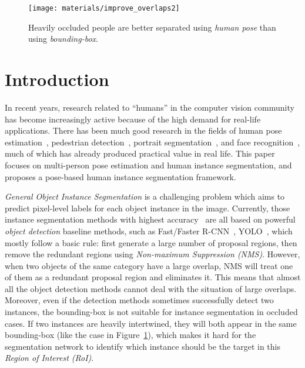 \documentclass[10pt,twocolumn,letterpaper]{article}
\begin{document}
\begin{figure}[t]
\centering
\texttt{[image: materials/improve\_overlaps2]}
\setlength{\abovecaptionskip}{-0.4cm}
\setlength{\belowcaptionskip}{-0.6cm}
\caption{Heavily occluded people are 
better separated using \emph{human pose} than using \emph{bounding-box}.}
\label{fig:improve_overlaps}
\end{figure}

\section{Introduction}
\label{intro}

In recent years, research related to ``humans'' in the computer vision community has become increasingly active because of the high demand for real-life applications. There has been much good research in the fields of human pose estimation~\cite{cao2017realtime,chen2017cascaded,fang2017rmpe,He2017Mask,lifkooee2019real,Newell2016Associative, xia2017survey}, pedestrian detection~\cite{mao2017can,zhang2016faster,zhang2018occluded}, portrait segmentation~\cite{shen2017high,shen2016automatic,Shen2016Deep}, and face recognition~\cite{ koestinger2011annotated, liu2017robust, ma2018robust, ouyang2016fast, wang2017joint, zhang2014facial, zhou2013extensive}, much of which has already produced practical value in real life.  This paper focuses on multi-person pose estimation and human instance segmentation, and proposes a pose-based human instance segmentation framework.

\emph{General Object Instance Segmentation} is a challenging problem which aims to predict pixel-level labels for each object instance in the image. Currently, those instance segmentation methods with highest accuracy~\cite{dai2016instance, He2017Mask, li2017fully,pinheiro2015learning} are all based on powerful \emph{object detection} baseline methods, such as Fast/Faster R-CNN~\cite{girshick2015fast,ren2015faster}, YOLO~\cite{redmon2016you}, which mostly follow a basic rule: first generate a large number of proposal regions, then remove the redundant regions using \emph{Non-maximum Suppression (NMS)}. However, when two objects of the same category have a large overlap, NMS will treat one of them as a redundant proposal region and eliminates it. This means that almost all the object detection methods cannot deal with the situation of large overlaps.
Moreover, even if the detection methods sometimes successfully detect two instances, the bounding-box is not suitable for instance segmentation in occluded cases. If two instances are heavily intertwined, they will both appear in the same bounding-box (like the case in Figure~\ref{fig:improve_overlaps}), which makes it hard for the segmentation network to identify which instance should be the target in this \emph{Region of Interest (RoI)}. 
\end{document}
